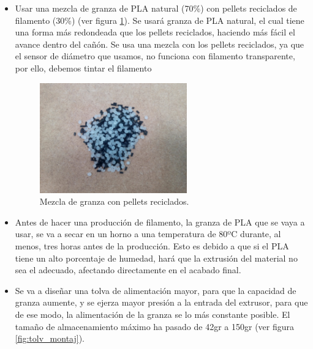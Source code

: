 \begin{itemize}
    \item{Usar una mezcla de granza de PLA natural (70\%) con pellets reciclados de filamento (30\%) (ver figura \ref{fig:2007105-mezc}). Se usará granza de PLA natural, el cual tiene una forma más redondeada que los pellets reciclados, haciendo más fácil el avance dentro del cañón. Se usa una mezcla con los pellets reciclados, ya que el sensor de diámetro que usamos, no funciona con filamento transparente, por ello, debemos tintar el filamento}
	    \begin{figure}[H]
		    \centering
		    \includegraphics[width=0.6\textwidth]{images/producciones/20072015/IMG_20150903_155859.jpg}
		    \caption{Mezcla de granza con pellets reciclados.}
		    \label{fig:2007105-mezc}
		\end{figure}
    \item{Antes de hacer una producción de filamento, la granza de PLA que se vaya a usar, se va a secar en un horno a una temperatura de 80ºC durante, al menos, tres horas antes de la producción. Esto es debido a que si el PLA tiene un alto porcentaje de humedad, hará que la extrusión del material no sea el adecuado, afectando directamente en el acabado final.}
    \item{Se va a diseñar una tolva de alimentación mayor, para que la capacidad de granza aumente, y se ejerza mayor presión a la entrada del extrusor, para que de ese modo, la alimentación de la granza se lo más constante posible. El tamaño de almacenamiento máximo ha pasado de 42gr a 150gr (ver figura \ref{fig:tolv_montaj}).}
\end{itemize}

